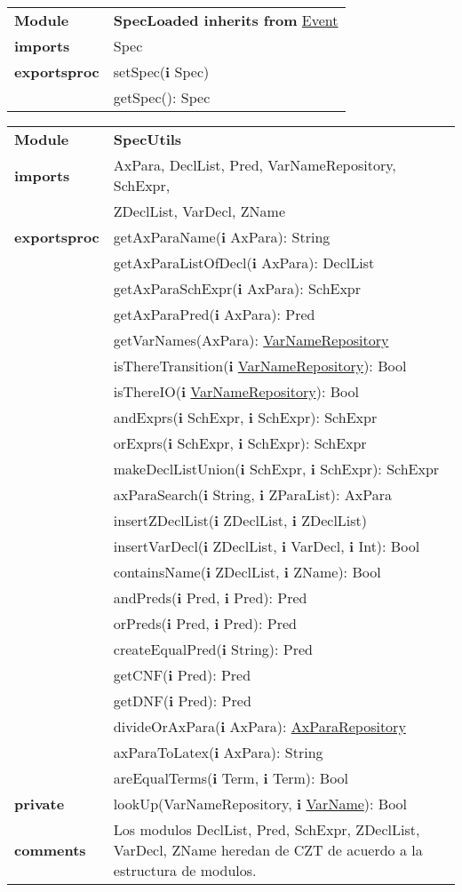 \documentclass[12pt,a4paper,fleqn]{report}
\newenvironment{module}[1]{\hypertarget{mi:#1}{} \vspace{0.5cm}\noindent\begin{tabular}{|p{0.2\textwidth} p{0.75\textwidth}|} \hline{\bf Module} & {\bf #1} \\}{\hline\end{tabular}\vspace{0.5cm}}
\newenvironment{hmodule}[2]{\hypertarget{mi:#1}{} \vspace{0.5cm}\noindent\begin{tabular}{|p{0.2\textwidth} p{0.75\textwidth}|} \hline{\bf Module} & {\bf #1 inherits from} \hyperlink{mi:#2}{#2} \\}{\hline\end{tabular}\vspace{0.5cm}}
\newcommand{\eproc}{{\bf exportsproc}}
\newcommand{\priv}{{\bf private}}
\newcommand{\proc}[1]{& #1 \\}
\newcommand{\e}[1]{{\bf i} \hyperlink{mi:#1}{#1}}
\newcommand{\eb}[1]{{\bf i} #1}
\newcommand{\imp}[1]{{\bf imports} & #1 \\}
\newcommand{\comm}[1]{{\bf comments} & #1 \\}
\newcommand{\mdr}[1]{\hyperlink{mi:#1}{#1}}
\newcommand{\extraline}[1]{& #1 \\}
\begin{document}
\begin{hmodule}{SpecLoaded}{Event}
\imp{Spec}
\eproc
\proc{setSpec(\eb {Spec})}
\proc{getSpec(): Spec}
\end{hmodule}



\begin{module}{SpecUtils}
\imp{AxPara, DeclList, Pred, VarNameRepository, SchExpr,}
\extraline{ZDeclList, VarDecl, ZName }
\eproc
\proc{getAxParaName(\eb {AxPara}): String}
\proc{getAxParaListOfDecl(\eb {AxPara}): DeclList}
\proc{getAxParaSchExpr(\eb {AxPara}): SchExpr}
\proc{getAxParaPred(\eb {AxPara}): Pred}
\proc{getVarNames(AxPara): \mdr{VarNameRepository}}
\proc{isThereTransition(\e {VarNameRepository}): Bool}
\proc{isThereIO(\e {VarNameRepository}): Bool}
\proc{andExprs(\eb {SchExpr}, \eb {SchExpr}): SchExpr}
\proc{orExprs(\eb {SchExpr}, \eb {SchExpr}): SchExpr}
\proc{makeDeclListUnion(\eb {SchExpr}, \eb {SchExpr}): SchExpr}
\proc{axParaSearch(\eb {String}, \eb {ZParaList}): AxPara}
\proc{insertZDeclList(\eb {ZDeclList}, \eb {ZDeclList})}
\proc{insertVarDecl(\eb {ZDeclList}, \eb {VarDecl}, \eb {Int}): Bool}
\proc{containsName(\eb {ZDeclList}, \eb {ZName}): Bool}
\proc{andPreds(\eb {Pred}, \eb {Pred}): Pred}
\proc{orPreds(\eb {Pred}, \eb {Pred}): Pred}
\proc{createEqualPred(\eb {String}): Pred}
\proc{getCNF(\eb {Pred}): Pred}
\proc{getDNF(\eb {Pred}): Pred}
\proc{divideOrAxPara(\eb {AxPara}): \mdr{AxParaRepository}}
\proc{axParaToLatex(\eb {AxPara}): String}
\proc{areEqualTerms(\eb {Term}, \eb {Term}): Bool}
\priv
\proc{lookUp(VarNameRepository, \e {VarName}): Bool}
\comm{Los modulos DeclList, Pred, SchExpr, ZDeclList, VarDecl, ZName heredan de CZT de acuerdo a la estructura de modulos.}

\end{module}
\end{document}
